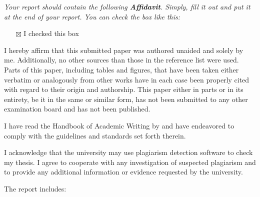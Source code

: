 \documentclass[
  a4paper,
  onecolumn,
  oneside]{scrartcl}
\providecommand{\tightlist}{%
  \setlength{\itemsep}{0pt}\setlength{\parskip}{0pt}}\usepackage{longtable,booktabs,array}
\begin{document}
\emph{Your report should contain the following \textbf{Affidavit}.
Simply, fill it out and put it at the end of your report. You can check
the box like this:}

\begin{itemize}
\tightlist
\item[$\boxtimes$]
  I checked this box
\end{itemize}

\begin{tcolorbox}[enhanced jigsaw, toprule=.15mm, breakable, opacityback=0, arc=.35mm, left=2mm, leftrule=.75mm, colback=white, colframe=quarto-callout-tip-color-frame, rightrule=.15mm, bottomrule=.15mm]

I hereby affirm that this submitted paper was authored unaided and
solely by me. Additionally, no other sources than those in the reference
list were used. Parts of this paper, including tables and figures, that
have been taken either verbatim or analogously from other works have in
each case been properly cited with regard to their origin and
authorship. This paper either in parts or in its entirety, be it in the
same or similar form, has not been submitted to any other examination
board and has not been published.

I have read the Handbook of Academic Writing by
\citet{Hildebrandt2019Handbook} and have endeavored to comply with the
guidelines and standards set forth therein.

I acknowledge that the university may use plagiarism detection software
to check my thesis. I agree to cooperate with any investigation of
suspected plagiarism and to provide any additional information or
evidence requested by the university.

The report includes:


\end{tcolorbox}
\end{document}
